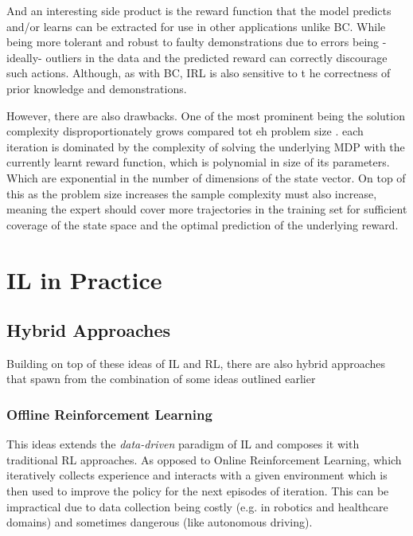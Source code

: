 And an interesting side product is the reward function that the model predicts and/or learns can be extracted for use in other applications unlike BC. While being more tolerant and robust to faulty demonstrations due to errors being -ideally- outliers in the data and the predicted reward can correctly discourage such actions. Although, as with BC, IRL is also sensitive to t he correctness of prior knowledge and demonstrations.


However, there are also drawbacks. One of the most prominent being the solution complexity disproportionately grows compared tot eh problem size \cite{ARORA2021103500}. each iteration is dominated by the complexity of solving the underlying MDP with the currently learnt reward function, which is polynomial in size of its parameters. Which are exponential in the number of dimensions of the state vector. On top of this as the problem size increases the sample complexity must also increase, meaning the expert should cover more trajectories in the training set for sufficient coverage of the state space and the optimal prediction of the underlying reward.

\section{IL in Practice}



\subsection{Hybrid Approaches}
Building on top of these ideas of IL and RL, there are also hybrid approaches that spawn from the combination of some ideas outlined earlier

\subsubsection{Offline Reinforcement Learning}
This ideas extends the \emph{data-driven} paradigm of IL and composes it with traditional RL approaches. As opposed to Online Reinforcement Learning, which iteratively collects experience and interacts with a given environment which is then used to improve the policy for the next episodes of iteration. This can be impractical due to data collection being costly (e.g. in robotics and healthcare domains) and sometimes dangerous (like autonomous driving). 

